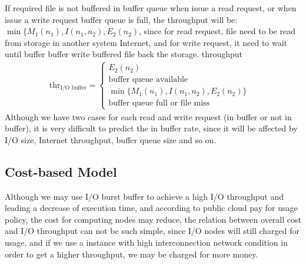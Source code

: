 If required file is not buffered in buffer queue when issue a read request, or when issue a write request buffer queue is full, the throughput will be:$\min\{M_1(n_1),I(n_1,n_2),E_2(n_2)$, since for read request, file need to be read from storage in another system Internet, and for write request, it need to wait until buffer buffer write buffered file back the storage.
throughput%
\begin{eqnarray}
	\text{thr}_{\text{I/O buffer}}=\begin{cases}
		E_2(n_2)&\\
		\text{buffer queue available}&\\ 
		\min\{M_1(n_1),I(n_1,n_2),E_2(n_2)\}& \\
		\text{buffer queue full or file miss}&
	\end{cases} \label{throughput2}
\end{eqnarray}
Although we have two cases for each read and write request (in buffer or not in buffer), it is very difficult to predict the in buffer rate, since it will be affected by I/O size, Internet throughput, buffer queue size and so on.


\subsection{Cost-based Model}
Although we may use I/O burst buffer to achieve a high I/O throughput and leading a decrease of execution time, and according to public cloud pay for usage policy, the cost for computing nodes may reduce, the relation between overall cost and I/O throughput can not be such simple, since I/O nodes will still charged for usage, and if we use a instance with high interconnection network condition in order to get a higher throughput, we may be charged for more money.

